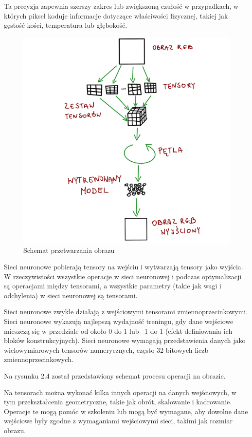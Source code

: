 \documentclass[brudnopis]{xmgr}
\begin{document}
 Ta precyzja zapewnia szerszy zakres lub zwiększoną czułość w przypadkach, w których piksel koduje informacje dotyczące właściwości fizycznej, takiej jak gęstość kości, temperatura lub głębokość.
 
 \begin{figure}[!tbh]
\centering
\includegraphics[width=.8\hsize]{fig/5}
\caption{Schemat przetwarzania obrazu\label{RYS.5}}
\end{figure}

Sieci neuronowe pobierają tensory na wejściu i wytwarzają tensory jako wyjścia. W rzeczywistości wszystkie operacje w sieci neuronowej i podczas optymalizacji są operacjami między tensorami, a wszystkie parametry (takie jak wagi i odchylenia) w sieci neuronowej są tensorami.



Sieci neuronowe zwykle działają z wejściowymi tensorami zmiennoprzecinkowymi. Sieci neuronowe wykazują najlepszą wydajność treningu, gdy dane wejściowe mieszczą się w przedziale od około 0 do 1 lub –1 do 1 (efekt definiowania ich bloków konstrukcyjnych). Sieci neuronowe wymagają przedstawienia danych jako wielowymiarowych tensorów numerycznych, często 32-bitowych liczb zmiennoprzecinkowych.

Na rysunku 2.4 został przedstawiony schemat procesu operacji na obrazie.

Na tensorach można  wykonać kilka innych operacji na danych wejściowych, w tym przekształcenia geometryczne, takie jak obrót, skalowanie i kadrowanie. Operacje te mogą pomóc w szkoleniu lub mogą być wymagane, aby dowolne dane wejściowe były zgodne z wymaganiami wejściowymi sieci, takimi jak rozmiar obrazu.
\end{document}
